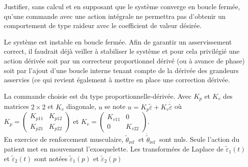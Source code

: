 \begin{question}
\label{2023_ccs_psi_q_25}
Justifier, sans calcul et en supposant que le système converge en boucle fermée, qu'une commande avec une action intégrale ne permettra pas d'obtenir un comportement de type raideur avec le coefficient de valeur désirée.
\end{question}
\ifprof
\begin{corrige}
Le système est instable en boucle fermée. Afin de garantir un asservissement correct, il faudrait déjà veiller à stabiliser le système et pour cela privilégié une action dérivée soit par un correcteur proportionnel dérivé (ou à avance de phase) soit par l'ajout d'une boucle interne tenant compte de la dérivée des grandeurs asservies (ce qui revient également à mettre en place une correction dérivée.
\end{corrige}
\else
\fi


\ifprof
\else
La commande choisie est du type proportionnelle-dérivée. Avec $K_{p}$ et $K_{v}$ des matrices $2 \times 2$ et $K_{v}$ diagonale, $u$ se note $u=K_{p} \tilde{\varepsilon}+K_{v} \dot{\tilde{\varepsilon}}$ où $K_{p}=\left(\begin{array}{cc}K_{p 11} & K_{p 12} \\ K_{p 21} & K_{p 22}\end{array}\right)$ et $K_{v}=\left(\begin{array}{cc}K_{v 11} & 0 \\ 0 & K_{v 22}\end{array}\right)$.\\
En exercice de renforcement musculaire, $\tilde{\theta}_{\text {ref }}$ et $\dot{\tilde{\theta}}_{\text {ref }}$ sont nuls. Seule l'action du patient met en mouvement l'exosquelette. Les transformées de Laplace de $\tilde{\varepsilon}_{1}(t)$ et $\tilde{\varepsilon}_{2}(t)$ sont notées $\tilde{\varepsilon}_{1}(p)$ et $\tilde{\varepsilon}_{2}(p)$\\
\fi


